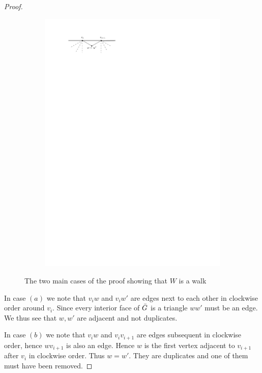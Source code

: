 \begin{proof}
\begin{figure}[h]
\begin{subfigure}[b]{0.5\linewidth}
        \includegraphics[width=\linewidth]{redAlgo/img/walkProofB}
        \vspace{1cm}

        \caption{}
    \end{subfigure}

    	\caption{The two main cases of the proof showing that $W$ is a walk}
	\label{fig:walkproof}
\end{figure}


In case $(a)$ we note that $v_i w$ and $v_i w'$ are edges next to each other in clockwise order around $v_i$. Since every interior face of $\bar{G}$ is a triangle $ww'$ must be an edge. We thus see that $w, w'$ are adjacent and not duplicates.

In case $(b)$ we note that $v_i w$ and $v_i v_{i+1}$ are edges subsequent in clockwise order, hence $wv_{i+1}$ is also an edge. Hence $w$ is the first vertex adjacent to $v_{i+1}$ after $v_i$ in clockwise order. Thus $w= w'$. They are duplicates and one of them must have been removed.


\end{proof}
